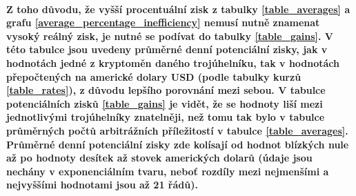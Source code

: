 \documentclass[thesis=B,czech]{FITthesis}[2019/03/21]
\begin{document}
\paragraph{
Z toho důvodu, že vyšší procentuální zisk z tabulky \ref{table_averages} a grafu \ref{average_percentage_inefficiency} nemusí nutně znamenat vysoký reálný zisk, je nutné se podívat do tabulky \ref{table_gains}. V této tabulce jsou uvedeny průměrné denní potenciální zisky, jak v hodnotách jedné z kryptoměn daného trojúhelníku, tak v hodnotách přepočtených na americké dolary USD (podle tabulky kurzů \ref{table_rates}), z důvodu lepšího porovnání mezi sebou. V tabulce potenciálních zisků \ref{table_gains} je vidět, že se hodnoty liší mezi jednotlivými trojúhelníky znatelněji, než tomu tak bylo v tabulce průměrných počtů arbitrážních příležitostí v tabulce \ref{table_averages}. Průměrné denní potenciální zisky zde kolísají od hodnot blízkých nule až po hodnoty desítek až stovek amerických dolarů (údaje jsou nechány v exponenciálním tvaru, neboť rozdíly mezi nejmenšími a nejvyššími hodnotami jsou až 21 řádů). 
}
\end{document}
